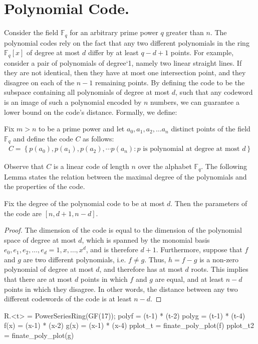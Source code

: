 
\newcommand{\FF}{\mathbb{F}_{q}}
\section{Polynomial Code.} Consider the field $\FF$ for an arbitrary prime power $q$ greater than $n$. The polynomial codes rely on the fact that any two different polynomials in the ring $\FF\left[ x \right]$ of degree at most $d$ differ by at least $q - d + 1$ points. For example, consider a pair of polynomials of degree`1, namely two linear straight lines. If they are not identical, then they have at most one intersection point, and they disagree on each of the $n-1$ remaining points. By defining the code to be the subspace containing all polynomials of degree at most $d$, such that any codeword is an image of such a polynomial encoded by $n$ numbers, we can guarantee a lower bound on the code's distance. Formally, we define:
\begin{definition}
  Fix $m > n $ to be a prime power and let $a_{0},a_{1},a_{2},\ldots a_{n}$ distinct points of the field $\FF$  and define the code $C$ as follows:  
  \begin{equation*}
    \begin{split}
      C = \left\{p\left(a_{0}\right),p\left(a_{1}\right),p\left(a_{2}\right),\cdots p\left(a_{n}\right) : p \text{ is polynomial at degree at most } d \right\}
    \end{split}
  \end{equation*}
\end{definition}
Observe that $C$ is a linear code of length $n$ over the alphabet $\FF$. The following Lemma states the relation between the maximal degree of the polynomials and the properties of the code.
\begin{lemma}
Fix the degree of the polynomial code to be at most $d$. Then the parameters of the code are $[n, d+1, n-d]$.
  \label{polycode}
\end{lemma}
\begin{proof}
The dimension of the code is equal to the dimension of the polynomial space of degree at most $d$, which is spanned by the monomial basis $e_{0}, e_{1}, e_{2}, \dots, e_{d} = 1, x, \dots, x^{d}$, and is therefore $d+1$. Furthermore, suppose that $f$ and $g$ are two different polynomials, i.e. $f \neq g$. Thus, $h = f-g$ is a non-zero polynomial of degree at most $d$, and therefore has at most $d$ roots. This implies that there are at most $d$ points in which $f$ and $g$ are equal, and at least $n-d$ points in which they disagree. In other words, the distance between any two different codewords of the code is at least $n-d$.
\end{proof}
\begin{sagesilent}
R.<t> = PowerSeriesRing(GF(17));
polyf = (t-1) * (t-2)
polyg = (t-1) * (t-4)
f(x) = (x-1) * (x-2)
g(x) = (x-1) * (x-4)
pplot_t = finate_poly_plot(f)
pplot_t2 = finate_poly_plot(g)
\end{sagesilent}
 
\begin{figure}[H]
  \label{fig:polyexample}
\end{figure}



